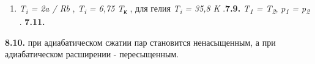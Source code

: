\begin{enumerate}
\def\labelenumi{\arabic{enumi}.}
\setcounter{enumi}{7}
\item
  \emph{T\textsubscript{i} = 2a / Rb} , \emph{T\textsubscript{i} = 6,75
  T\textsubscript{к}} , для гелия \emph{T\textsubscript{i} = 35,8 K}
  .\textbf{7.9.} \emph{T\textsubscript{1} = T\textsubscript{2}},
  \emph{p\textsubscript{1} = p\textsubscript{2}} . \textbf{7.11.}
\end{enumerate}

\textbf{8.10.} при адиабатическом сжатии пар становится ненасыщенным, а
при адиабатическом расширении - пересыщенным.